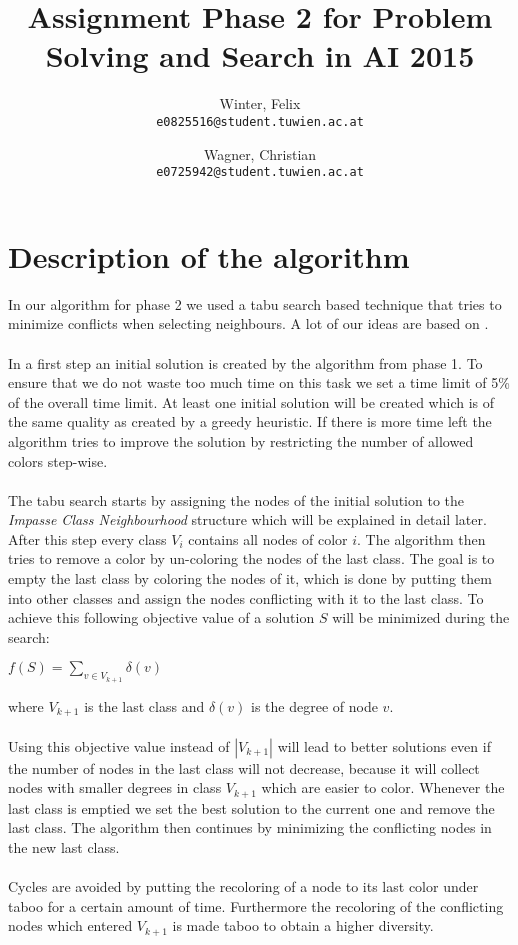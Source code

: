 \documentclass[a4paper]{scrartcl}
\author{
  Winter, Felix\\
  \texttt{e0825516@student.tuwien.ac.at}
  \and
  Wagner, Christian\\
  \texttt{e0725942@student.tuwien.ac.at}
}
\title{Assignment Phase 2 for Problem Solving and Search in AI 2015}
\begin{document}
\setlength{\abovedisplayskip}{0pt}
\setlength{\belowdisplayskip}{0pt}

\begingroup
 \makeatletter
 \maketitle
\endgroup

\section{Description of the algorithm}

In our algorithm for phase 2 we used a tabu search based technique that tries to minimize conflicts when selecting neighbours. A lot of our ideas are based on \cite{malagutitabu}.\\
\\
In a first step an initial solution is created by the algorithm from phase 1. 
To ensure that we do not waste too much time on this task we set a time limit of 5\% of the overall time limit.
At least one initial solution will be created which is of the same quality as created by a greedy heuristic. 
If there is more time left the algorithm tries to improve the solution by restricting the number of allowed colors step-wise.\\
\\
The tabu search starts by assigning the nodes of the initial solution to the \textit{Impasse Class Neighbourhood} structure which will be explained in detail later.
After this step every class $V_i$ contains all nodes of color $i$. 
The algorithm then tries to remove a color by un-coloring the nodes of the last class. The goal is to empty the last class by coloring the nodes of it, which is done by putting them into other classes and assign the nodes conflicting with it to the last class. 
To achieve this following objective value of a solution $S$ will be minimized during the search:\\
\begin{center}
$f(S) = \sum_{v \in V_{k+1}} \delta(v)$
\end{center}
where $V_{k+1}$ is the last class and $\delta(v)$ is the degree of node $v$.\\\\
Using this objective value instead of $|V_{k+1}|$ will lead to better solutions even if the number of nodes in the last class will not decrease, because it will collect nodes with smaller degrees in class $V_{k+1}$ which are easier to color.
Whenever the last class is emptied we set the best solution to the current one and remove the last class.
The algorithm then continues by minimizing the conflicting nodes in the new last class.\\\\
Cycles are avoided by putting the recoloring of a node to its last color under taboo for a certain amount of time. Furthermore the recoloring of the conflicting nodes which entered $V_{k+1}$ is made taboo to obtain a higher diversity.
\end{document}
